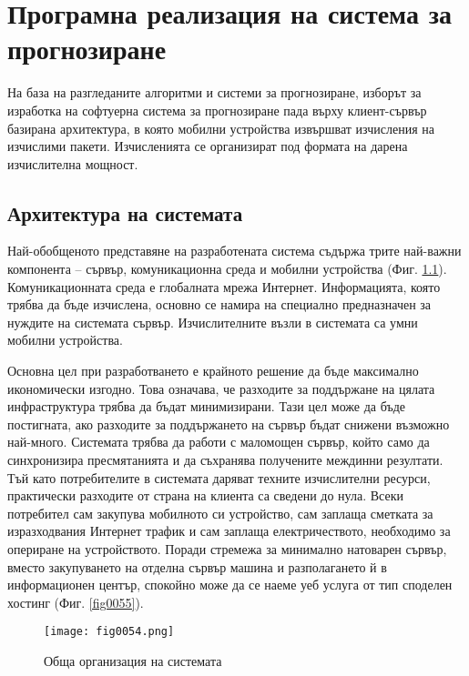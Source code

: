 ﻿\chapter{Програмна реализация на система за прогнозиране}

На база на разгледаните алгоритми и системи за прогнозиране, изборът за изработка на софтуерна система за прогнозиране пада върху клиент-сървър базирана архитектура, в която мобилни устройства извършват изчисления на изчислими пакети. Изчисленията се организират под формата на дарена изчислителна мощност. 

\section{Архитектура на системата}

Най-обобщеното представяне на разработената система съдържа трите най-важни компонента – сървър, комуникационна среда и мобилни устройства (Фиг. \ref{fig0054}). Комуникационната среда е глобалната мрежа Интернет. Информацията, която трябва да бъде изчислена, основно се намира на специално предназначен за нуждите на системата сървър. Изчислителните възли в системата са умни мобилни устройства. 

Основна цел при разработването е крайното решение да бъде максимално икономически изгодно. Това означава, че разходите за поддържане на цялата инфраструктура трябва да бъдат минимизирани. Тази цел може да бъде постигната, ако разходите за поддържането на сървър бъдат снижени възможно най-много. Системата трябва да работи с маломощен сървър, който само да синхронизира пресмятанията и да съхранява получените междинни резултати. Тъй като потребителите в системата даряват техните изчислителни ресурси, практически разходите от страна на клиента са сведени до нула. Всеки потребител сам закупува мобилното си устройство, сам заплаща сметката за изразходвания Интернет трафик и сам заплаща електричеството, необходимо за опериране на устройството. Поради стремежа за минимално натоварен сървър, вместо закупуването на отделна сървър машина и разполагането й в информационен център, спокойно може да се наеме уеб услуга от тип споделен хостинг (Фиг. \ref{fig0055}). 

\begin{figure}[H]
  \centering
  \texttt{[image: fig0054.png]}
  \caption{Обща организация на системата}
\label{fig0054}
\end{figure}

